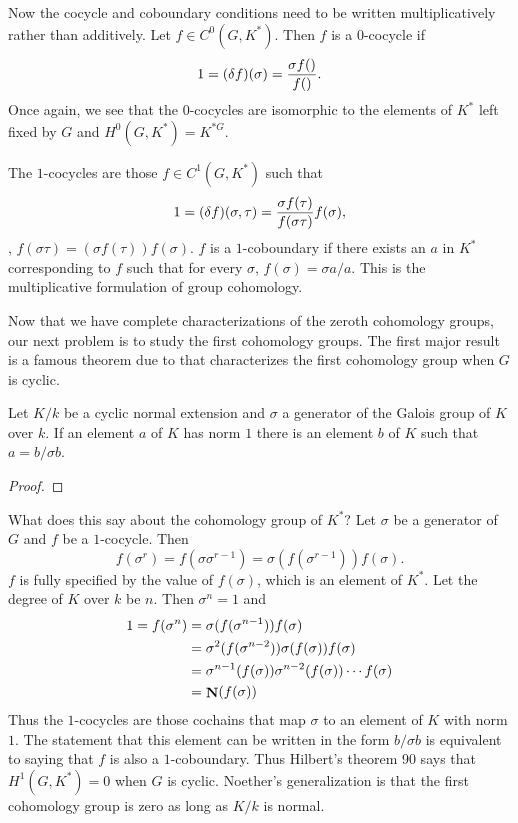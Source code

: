 Now the cocycle and coboundary conditions need to be written
multiplicatively rather than additively.  Let $f \in C^0(G,
K^{\ast})$.  Then $f$ is a $0$-cocycle if
\[
1 = (\delta f)(\sigma) = {\sigma f() \over f()}.
\]
Once again, we see that the $0$-cocycles are isomorphic to the elements
of $K^{\ast}$ left fixed by $G$ and $H^0(G, K^{\ast}) = K^{\ast G}$.

The $1$-cocycles are those 
$f \in C^1(G, K^{\ast})$ such that
\[
1 = (\delta f)(\sigma, \tau) 
    = {\sigma f(\tau) \over f(\sigma\tau)} f(\sigma),
\]
\ie, $f(\sigma\tau) = (\sigma f(\tau)) f(\sigma).$
$f$ is a $1$-coboundary if there exists an $a$ in $K^{\ast}$
corresponding to $f$ such that for every $\sigma$, $f(\sigma) = \sigma a / a$.
This is the multiplicative formulation of group cohomology.

Now that we have complete characterizations of the zeroth cohomology
groups, our next problem is to study the first cohomology groups.  The
first major result is a famous theorem due to {\Hilbert}
\cite{Hilbert:ANT} that characterizes the first cohomology group when
$G$ is cyclic.

\begin{proposition}
\label{Hilbert:Ninety:Prop}
Let $K/k$ be a cyclic normal extension and $\sigma$ a generator of the
Galois group of $K$ over $k$.  If an element $a$ of $K$ has norm $1$
there is an element $b$ of $K$ such that $a= b/\sigma b$.
\end{proposition}

\begin{proof}
\end{proof}

What does this say about the cohomology group of $K^{\ast}$?
Let $\sigma$ be a generator of $G$ and $f$ be a $1$-cocycle.  Then
\[
f(\sigma^r) = f(\sigma \sigma^{r-1}) = \sigma(f(\sigma^{r-1}))
f(\sigma).
\]
$f$ is fully specified by the value of $f(\sigma)$, which is an element
of $K^{\ast}$.  Let the degree of $K$ over $k$ be $n$.  Then 
$\sigma^n = 1$ and
\[
\begin{aligned}
1 = f(\sigma^n) &= \sigma(f(\sigma^{n-1})) f(\sigma) \\
&= \sigma^2(f(\sigma^{n-2})) \sigma(f(\sigma)) f(\sigma) \\
& = \sigma^{n-1}(f(\sigma)) \sigma^{n-2}(f(\sigma)) \cdots f(\sigma)\\
& = \mathop{\mathbf{N}}\nolimits(f(\sigma))
\end{aligned}
\]
Thus the $1$-cocycles are those cochains that map $\sigma$ to an element
of $K$ with norm $1$.  The statement that this element can be written in
the form $b / \sigma b$ is equivalent to saying that $f$ is also a
$1$-coboundary.  Thus Hilbert's theorem 90 says that $H^1(G, K^{\ast}) =
0$ when $G$ is cyclic.  Noether's generalization is that the first
cohomology group is zero as long as $K/k$ is normal.

